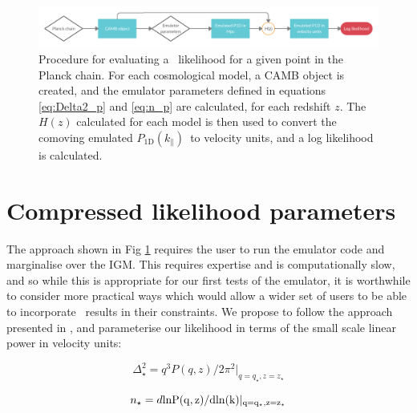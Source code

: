 \documentclass[preprintnumbers,prd,superscriptaddress,notitlepage,nofootinbib] {revtex4-1}
\newcommand{\fluxpower}{$P_\mathrm{1D}(k_\parallel)$}
\begin{document}
\begin{figure}[ht]
    \begin{center}
     \includegraphics[scale=0.2]{Figures/Parameter_mapping.png}
    \end{center}
    \caption{Procedure for evaluating a \lyaf\ likelihood for a given
    point in the Planck chain.
    For each cosmological
    model, a \textsc{CAMB} object is created, and the emulator parameters defined
    in equations \ref{eq:Delta2_p} and \ref{eq:n_p} are calculated, for each redshift $z$.
    The $H(z)$ calculated
    for each model is then used to convert the comoving emulated \fluxpower\
    to velocity units, and a log likelihood is calculated.}
    \label{fig:param_map1}
\end{figure}



\section{Compressed likelihood parameters}
\label{sec:compressed}
The approach shown in Fig \ref{fig:param_map1} requires the user to run the emulator
code and marginalise over the IGM. This requires expertise and is computationally slow,
and so while this is appropriate for our first tests of the emulator, it is worthwhile to
consider more practical ways which would allow a wider set of users to be able to
incorporate \lyaf\ results in their constraints. We propose to follow
the approach presented in \cite{McDonald2005a}, and parameterise our likelihood
in terms of the small scale linear power in velocity units:

\begin{equation}
    \label{eq:Delta2_star}
    \Delta^2_\star=q^3P(q, z)/2\pi^2|_{q=q_\star,z=z_\star}
\end{equation}

\begin{equation}
    \label{eq:n_star}
    n_\star=d\rm{ln}P(q,z) / d \rm{ln}(k)|_{q=q_\star,z=z_\star}
\end{equation}
\end{document}
